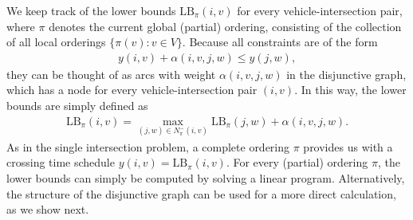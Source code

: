 \documentclass[a4paper]{article}
\theoremstyle{definition}
\theoremstyle{plain}
\begin{document}
We keep track of the lower bounds $\mathrm{LB}_{\pi}(i, v)$ for every
vehicle-intersection pair, where $\pi$ denotes the current global (partial)
ordering, consisting of the collection of all local orderings
$\{ \pi(v) : v \in V \}$.
%
Because all constraints are of the form
\begin{align*}
  y(i, v) + \alpha(i, v, j, w) \leq y(j, w) ,
\end{align*}
they can be thought of as arcs with weight $\alpha(i, v, j, w)$ in the
disjunctive graph, which has a node for every vehicle-intersection pair
$(i, v)$. In this way, the lower bounds are simply defined as
\begin{align*}
  \mathrm{LB}_{\pi}(i, v) = \max_{(j, w) \in N_{\pi}^{-}(i, v)} \mathrm{LB}_{\pi}(j, w) + \alpha(i, v, j, w).
\end{align*}
%
As in the single intersection problem, a complete ordering $\pi$ provides us
with a crossing time schedule $y(i, v) = \mathrm{LB}_{\pi}(i, v)$. For every
(partial) ordering $\pi$, the lower bounds can simply be computed by solving a
linear program. Alternatively, the structure of the disjunctive graph can be
used for a more direct calculation, as we show next.
\end{document}
